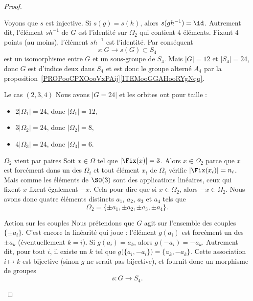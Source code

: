 \begin{proof}
\begin{subproof}
		Voyons que \( s\) est injective. Si \( s(g)=s(h)\), alors \( s(gh^{-1})=\id\). Autrement dit, l'élément \( sh^{-1}\) de \( G\) est l'identité sur \( \Omega_2\) qui contient \( 4\) éléments. Fixant \( 4\) points (au moins), l'élément \( sh^{-1}\) est l'identité. Par conséquent
		\begin{equation}
			s\colon G\to s(G)\subset S_4
		\end{equation}
		est un isomorphisme entre \( G\) et un sous-groupe de \( S_4\). Mais \( | G |=12\) et \( | S_4 |=24\), donc \( G\) est d'indice deux dans \( S_4\) et est donc le groupe alterné \( A_4\) par la proposition~\ref{PROPooCPXOooVxPAij}\ref{ITEMooGGAHooRYgNqq}.

		\item[Le cas \( (2,3,4)\)]
		Nous avons \( | G=24 |\) et les orbites ont pour taille :
		\begin{itemize}
			\item \( 2| \Omega_1 |=24\), donc \( | \Omega_1 |=12\),
			\item \( 3| \Omega_2 |=24\), donc \( | \Omega_2 |=8\),
			\item \( 4| \Omega_3 |=24\), donc  \( | \Omega_3 |=6\).
		\end{itemize}

		\begin{subproof}
			\item[\( \Omega_2\) vient par paires]
			Soit \( x\in \Omega\) tel que \( | \Fix(x) |=3\). Alors \( x\in\Omega_2\) parce que \( x\) est forcément dans un des \( \Omega_i\) et tout élément \( x_i\) de \( \Omega_i\) vérifie \( | \Fix(x_i) |=n_i\). Mais comme les éléments de \( \SO(3)\) sont des applications linéaires, ceux qui fixent \( x\) fixent également \( -x\). Cela pour dire que si \( x\in\Omega_2\), alors \( -x\in\Omega_2\). Nous avons donc quatre éléments distincts \( a_1\), \( a_2\), \( a_3\) et \( a_4\) tels que
			\begin{equation}
				\Omega_2=\{ \pm a_1,\pm a_2,\pm a_3,\pm a_4 \}.
			\end{equation}

			\item[Action sur les couples]
			Nous prétendons que \( G\) agit sur l'ensemble des couples \( \{ \pm a_i \}\). C'est encore la linéarité qui joue : l'élément \( g(a_i)\) est forcément un des \( \pm a_k\) (éventuellement \( k=i\)). Si \( g(a_i)=a_k\), alors \( g(-a_i)=-a_k\). Autrement dit, pour tout \( i\), il existe un \( k\) tel que \( g\big( \{ a_i,-a_i \} \big)=\{ a_k,-a_k \}\). Cette association \( i\mapsto k\) est bijective (sinon \( g\) ne serait pas bijective), et fournit donc un morphisme de groupes
			\begin{equation}
				s\colon G\to S_4.
			\end{equation}


\end{subproof}
\end{subproof}
\end{proof}
